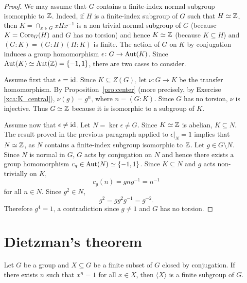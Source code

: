 \begin{proof}
	We may assume that $G$ contains a finite-index normal subgroup isomorphic to $\mathbb{Z}$. Indeed, 
	if $H$ is a finite-index subgroup of $G$ such that $H\simeq\mathbb{Z}$, then 
	$K=\cap_{x\in G}xHx^{-1}$ is a non-trivial normal subgroup of $G$ (because $K=\operatorname{Core}_G(H)$ and 
	$G$ has no torsion) and hence $K\simeq\mathbb{Z}$ (because  
	$K\subseteq H$) and $(G:K)=(G:H)(H:K)$ is finite.
	The action of $G$ on $K$ by conjugation induces a group homomorphism  
	$\epsilon\colon G\to\operatorname{Aut}(K)$. Since $\operatorname{Aut}(K)\simeq\operatorname{Aut}(\mathbb{Z})=\{-1,1\}$, 
	there are two cases to consider.
	
	Assume first that $\epsilon=\operatorname{id}$. Since $K\subseteq Z(G)$, let
	$\nu\colon G\to K$ be the transfer homomorphism. By
	Proposition~\ref{pro:center} (more precisely, 
	by Exercise \ref{xca:K_central}), $\nu(g)=g^n$, where $n=(G:K)$. Since
	$G$ has no torsion, $\nu$ is injective. Thus
	$G\simeq\mathbb{Z}$ because it is isomorphic to a subgroup of $K$.

	Assume now that $\epsilon\ne\operatorname{id}$. Let $N=\ker\epsilon\ne G$. Since
	$K\simeq\mathbb{Z}$ is abelian, $K\subseteq N$. The result proved in the previous paragraph 
	applied to $\epsilon|_N=1$ implies that $N\simeq\mathbb{Z}$, as 
	$N$ contains a finite-index subgroup isomorphic to $\mathbb{Z}$. Let $g\in G\setminus N$. 
	Since $N$ is normal in $G$, $G$ acts by conjugation on $N$ and hence 
	there exists a group homomorphism $c_g\in\operatorname{Aut}(N)\simeq\{-1,1\}$. Since
	$K\subseteq N$ and $g$ acts non-trivially on $K$, 
	\[
	c_g(n)=gng^{-1}=n^{-1}
	\]
	for all $n\in N$.  Since 
	$g^2\in N$, 
	\[
		g^2=gg^2g^{-1}=g^{-2}.
	\]
	Therefore $g^4=1$, a contradiction since $g\ne1$ and $G$ has no torsion.
\end{proof}

\section{Dietzman's theorem}

\begin{theorem}[Dietzmann]
	\label{thm:Dietzmann} 
	Let $G$ be a group and $X\subseteq G$ be a finite subset of $G$ closed by
	conjugation. If there exists $n$ such that $x^n=1$ for all $x\in X$, then
	$\langle X\rangle$ is a finite subgroup of $G$.
\end{theorem}

